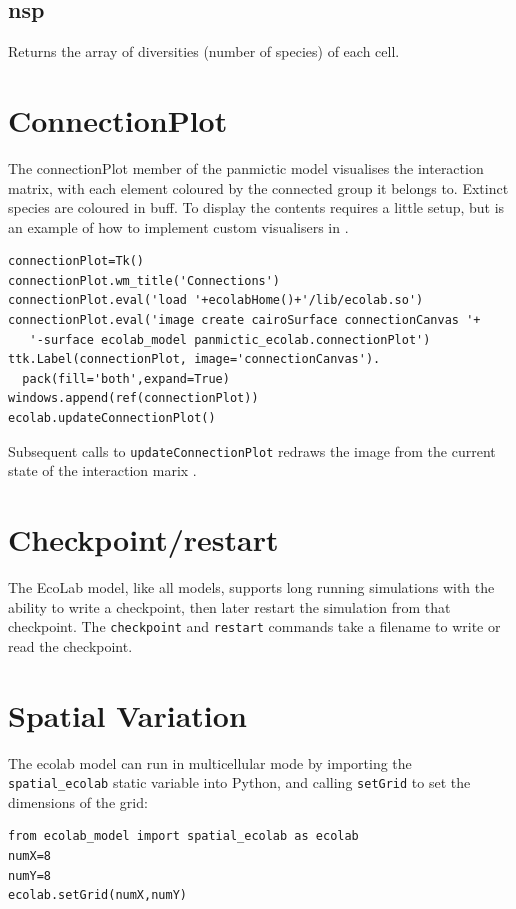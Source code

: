 \documentclass{article}
\newcommand{\bbeta}{\mbox{\boldmath{$\beta$}}}   %
\newcommand{\EcoLab}{{\sffamily\slshape
    \mbox{\raisebox{.5ex}{Eco}\hspace{-.4em}{\makebox[.5em]{L}ab}}}}
\begin{document}
\subsection{nsp}

Returns the array of diversities (number of species) of each cell.

\section{ConnectionPlot}

The connectionPlot member of the panmictic model visualises the
interaction matrix, with each element coloured by the connected group
it belongs to. Extinct species are coloured in buff. To display the
contents requires a little setup, but is an example of how to
implement custom visualisers in \EcoLab.

\begin{verbatim}
connectionPlot=Tk()
connectionPlot.wm_title('Connections')
connectionPlot.eval('load '+ecolabHome()+'/lib/ecolab.so')
connectionPlot.eval('image create cairoSurface connectionCanvas '+
   '-surface ecolab_model panmictic_ecolab.connectionPlot')
ttk.Label(connectionPlot, image='connectionCanvas').
  pack(fill='both',expand=True)
windows.append(ref(connectionPlot))
ecolab.updateConnectionPlot()
\end{verbatim}

Subsequent calls to \verb+updateConnectionPlot+ redraws the image from
the current state of the interaction marix \bbeta.

\section{Checkpoint/restart}

The EcoLab model, like all \EcoLab{} models, supports long running
simulations with the ability to write a checkpoint, then later restart
the simulation from that checkpoint. The \verb+checkpoint+ and
\verb+restart+ commands take a filename to write or read the
checkpoint.

\section{Spatial Variation}\label{spatial}

The ecolab model can run in multicellular mode by importing the
\verb+spatial_ecolab+ static variable into Python, and calling
\verb+setGrid+ to set the dimensions of the grid:
\begin{verbatim}
from ecolab_model import spatial_ecolab as ecolab
numX=8
numY=8
ecolab.setGrid(numX,numY)
\end{verbatim}
\end{document}
